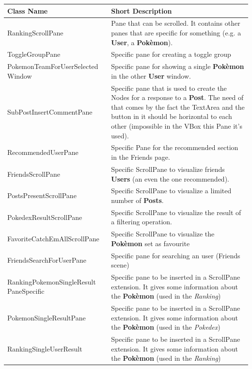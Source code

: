 \setlength{\tabcolsep}{10pt} %
\renewcommand{\arraystretch}{1.5} %
\begin{center}
	\begin{longtable}{| m{14em} | m{19em} |} 
		\hline
		\textbf{Class Name} & \textbf{Short Description} \\ [0.5ex] 
		\hline
		RankingScrollPane & Pane that can be scrolled. It contains other panes that are specific for something (e.g. a \textbf{User}, a \textbf{Pokèmon}).\\ 
		\hline
		ToggleGroupPane & Specific pane for creating a toggle group\\ 
		\hline
		PokemonTeamForUserSelected Window & Specific pane for showing a single \textbf{Pokèmon} in the other \textbf{User} window.\\ 
		\hline
		SubPostInsertCommentPane & Specific pane that is used to create the Nodes for a response to a \textbf{Post}. The need of that comes by the fact the TextArea and the button in it should be horizontal to each other (impossible in the VBox this Pane it’s used).\\ 
		\hline
		RecommendedUserPane & Specific Pane for the recommended section in the Friends page.\\ 
		\hline
		FriendsScrollPane & Specific ScrollPane to visualize friends \textbf{Users} (an even the one recommended).\\ 
		\hline
		PostsPresentScrollPane & Specific ScrollPane to visualize a limited number of \textbf{Posts}.\\ 
		\hline
		PokedexResultScrollPane & Specific ScrollPane to visualize the result of a filtering operation.\\ 
		\hline
		FavoriteCatchEmAllScrollPane & Specific ScrollPane to visualize the \textbf{Pokèmon} set as favourite\\ 
		\hline
		FriendsSearchForUserPane & Specific pane for searching an user (Friends scene)\\ 
		\hline
		RankingPokemonSingleResult PaneSpecific & Specific pane to be inserted in a ScrollPane extension. It gives some information about the \textbf{Pokèmon} (used in the \textit{Ranking})\\ 
		\hline
		PokemonSingleResultPane & Specific pane to be inserted in a ScrollPane extension. It gives some information about the \textbf{Pokèmon} (used in the \textit{Pokedex})\\
		\hline
		RankingSingleUserResult & Specific pane to be inserted in a ScrollPane extension. It gives some information about the \textbf{Pokèmon} (used in the \textit{Ranking})\\
		\hline
	\end{longtable}
\end{center}
\endgroup

